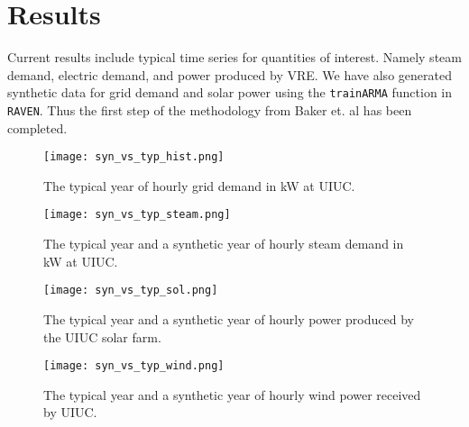 \section{Results}

Current results include typical time series for quantities of interest. Namely steam demand, electric demand, and power produced by VRE. We have also generated synthetic data for grid demand and solar power using the \texttt{trainARMA} function in \texttt{RAVEN}. Thus the first step of the methodology from Baker et. al has been completed.

\begin{figure}[H]
 	\centering
 	\label{fig:grid-demand}
 	\texttt{[image: syn\_vs\_typ\_hist.png]}
 	\caption{The typical year of hourly grid demand in kW at UIUC.}
\end{figure} 
\begin{figure}[H]
	\centering
	\label{fig:steam-demand}
	\texttt{[image: syn\_vs\_typ\_steam.png]}
	\caption{The typical year and a synthetic year of hourly steam demand in kW at UIUC.}
\end{figure}
\begin{figure}[H]
	\centering
	\label{fig:solar-power}
	\texttt{[image: syn\_vs\_typ\_sol.png]}
	\caption{The typical year and a synthetic year of hourly power produced by the UIUC solar farm.}
\end{figure}
\begin{figure}[H]
	\centering
	\label{fig:wind-power}
	\texttt{[image: syn\_vs\_typ\_wind.png]}
	\caption{The typical year and a synthetic year of hourly wind power received by UIUC.}
\end{figure}